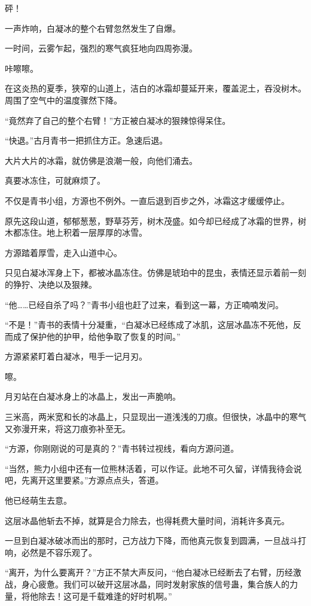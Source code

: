 \begin{this_body}
砰！

一声炸响，白凝冰的整个右臂忽然发生了自爆。

一时间，云雾乍起，强烈的寒气疯狂地向四周弥漫。

咔嚓嚓。

在这炎热的夏季，狭窄的山道上，洁白的冰霜却蔓延开来，覆盖泥土，吞没树木。周围了空气中的温度骤然下降。

“竟然弃了自己的整个右臂！”方正被白凝冰的狠辣惊得呆住。

“快退。”古月青书一把抓住方正。急速后退。

大片大片的冰霜，就仿佛是浪潮一般，向他们涌去。

真要冰冻住，可就麻烦了。

不仅是青书小组，方源也不例外。一直后退到百步之外，冰霜这才缓缓停止。

原先这段山道，郁郁葱葱，野草芬芳，树木茂盛。如今却已经成了冰霜的世界，树木都冻住。地上积着一层厚厚的冰雪。

方源踏着厚雪，走入山道中心。

只见白凝冰浑身上下，都被冰晶冻住。仿佛是琥珀中的昆虫，表情还显示着前一刻的狰狞、决绝以及狠辣。

“他……已经自杀了吗？”青书小组也赶了过来，看到这一幕，方正喃喃发问。

“不是！”青书的表情十分凝重，“白凝冰已经练成了冰肌，这层冰晶冻不死他，反而成了保护他的护甲，给他争取了恢复的时间。”

方源紧紧盯着白凝冰，甩手一记月刃。

嚓。

月刃站在白凝冰身上的冰晶上，发出一声脆响。

三米高，两米宽和长的冰晶上，只显现出一道浅浅的刀痕。但很快，冰晶中的寒气又弥漫开来，将这刀痕弥补至无。

“方源，你刚刚说的可是真的？”青书转过视线，看向方源问道。

“当然，熊力小组中还有一位熊林活着，可以作证。此地不可久留，详情我待会说吧，先离开这里要紧。”方源点点头，答道。

他已经萌生去意。

这层冰晶他斩去不掉，就算是合力除去，也得耗费大量时间，消耗许多真元。

一旦到白凝冰破冰而出的那时，己方战力下降，而他真元恢复到圆满，一旦战斗打响，必然是不容乐观了。

“离开，为什么要离开？”方正不禁大声反问，“他白凝冰已经断去了右臂，历经激战，身心疲惫。我们可以破开这层冰晶，同时发射家族的信号蛊，集合族人的力量，将他除去！这可是千载难逢的好时机啊。”


\end{this_body}
